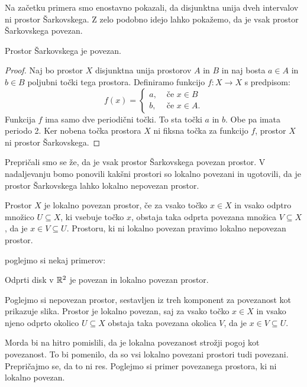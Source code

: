 \documentclass[../TG_magistrsko_delo_sections.tex]{subfiles}
\begin{document}
Na začetku primera smo enostavno pokazali, da disjunktna unija dveh intervalov ni prostor Šarkovskega. Z zelo podobno idejo lahko pokažemo, da je vsak prostor Šarkovskega povezan.

\begin{trditev}
Prostor Šarkovskega je povezan.
\end{trditev}
\begin{proof}
Naj bo prostor $X$ disjunktna unija prostorov $A$ in $B$ in naj bosta $a \in A$ in $b \in B$ poljubni točki tega prostora. Definiramo funkcijo $f:X \to X$ s predpisom:
\[ f(x) = \begin{cases}
  a, & \mbox{ če $x \in B $}\\
  b ,& \mbox{ če $x \in A$.}
  \end{cases}
  \]
Funkcija $f$ ima samo dve periodični točki. To sta točki $a$ in $b$. Obe pa imata periodo 2. Ker nobena točka prostora $X$ ni fiksna točka za funkcijo $f$, prostor $X$ ni prostor Šarkovskega.
\end{proof}




Prepričali smo se že, da je vsak prostor Šarkovskega povezan prostor. V nadaljevanju bomo ponovili kakšni prostori so lokalno povezani in ugotovili, da je prostor Šarkovskega lahko lokalno nepovezan prostor.

\begin{definicija}
Prostor $X$ je lokalno povezan prostor, če za vsako točko $x \in X$ in vsako odptro množico $U \subseteq X$, ki vsebuje točko $x$, obstaja taka odprta povezana množica $V \subseteq X$, da je $x \in V \subseteq U$. Prostoru, ki ni lokalno povezan pravimo lokalno nepovezan prostor.
\end{definicija}

poglejmo si nekaj primerov:
\begin{primer}
Odprti disk v $\mathbb R^2$ je povezan in lokalno povezan prostor.
\end{primer}

\begin{primer}
Poglejmo si nepovezan prostor, sestavljen iz treh komponent za povezanost kot prikazuje slika. Prostor je lokalno povezan, saj za vsako točko $x \in X$ in vsako njeno odprto okolico $U\subseteq X$ obstaja taka povezana okolica $V$, da je $x \in V \subseteq U$.
\end{primer}

Morda bi na hitro pomislili, da je lokalna povezanost strožji pogoj kot povezanost. To bi pomenilo, da so vsi lokalno povezani prostori tudi povezani. Prepričajmo se, da to ni res. Poglejmo si primer povezanega prostora, ki ni lokalno povezan.
\end{document}
